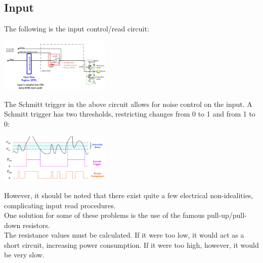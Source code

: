 \documentclass[nobib]{tufte-handout}
\begin{document}
\subsection{Input}
The following is the input control/read circuit: 
\begin{center}
    \includegraphics[width = 200px]{images/input_control.png}
\end{center}
The Schmitt trigger in the above circuit allows for noise control on the input.
A Schmitt trigger has two thresholds, restricting changes from 0 to 1 and from 1 to 0:
\begin{center}
    \includegraphics[width = 200px]{images/schmitt_example.png}
\end{center}
However, it should be noted that there exist quite a few electrical non-idealities, complicating input read procedures.\\
One solution for some of these problems is the use of the famous pull-up/pull-down  resistors.\\
The resistance values must be calculated. If it were too low, it would act as a short circuit, increasing power consumption. If it were too high, however, it would be very slow.\\
\end{document}

